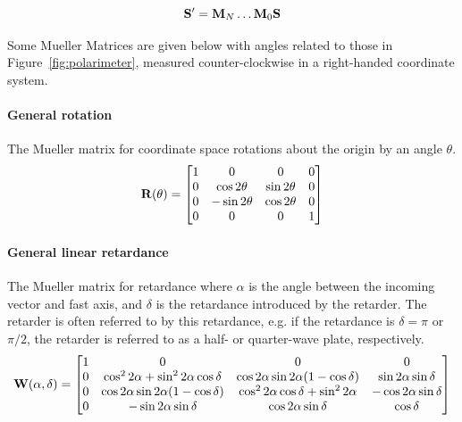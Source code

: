 \begin{equation}
  \mathbf{S}^{\prime} = \mathbf{M}_{N} \dots \mathbf{M}_{0} \mathbf{S}
  \label{eq:mueller_train}
\end{equation}

Some Mueller Matrices are given below with angles related to those in Figure~\ref{fig:polarimeter}, measured counter-clockwise in a right-handed coordinate system.

\paragraph{General rotation}
The Mueller matrix for coordinate space rotations about the origin by an angle $\theta$.
\begin{equation}
  \mathbf{R}(\theta) =
  \begin{bmatrix}
    1 & 0              & 0             & 0 \\
    0 & \cos 2 \theta  & \sin 2 \theta & 0 \\
    0 & -\sin 2 \theta & \cos 2 \theta & 0 \\
    0 & 0              & 0             & 1 \\
  \end{bmatrix}
  \label{matrix:rotate}
\end{equation}

\paragraph{General linear retardance}
The Mueller matrix for retardance where $\alpha$ is the angle between the incoming vector and fast axis, and $\delta$ is the retardance introduced by the retarder. The retarder is often referred to by this retardance, e.g. if the retardance is $\delta = \pi$ or $\pi / 2$, the retarder is referred to as a half- or quarter-wave plate, respectively.
\begin{equation}
  \mathbf{W}(\alpha, \delta) =
  \begin{bmatrix}
    1 & 0                                                 & 0                                                 & 0                          \\
    0 & \cos^{2} 2 \alpha + \sin^{2} 2 \alpha \cos \delta & \cos 2 \alpha \sin 2 \alpha  (1 - \cos \delta)    & \sin 2 \alpha \sin \delta  \\
    0 & \cos 2 \alpha \sin 2 \alpha  (1 - \cos \delta)    & \cos^{2} 2 \alpha \cos \delta + \sin^{2} 2 \alpha & -\cos 2 \alpha \sin \delta \\
    0 & -\sin 2 \alpha \sin \delta                        & \cos 2 \alpha \sin \delta                         & \cos \delta                \\
  \end{bmatrix}
  \label{matrix:retarder}
\end{equation}

